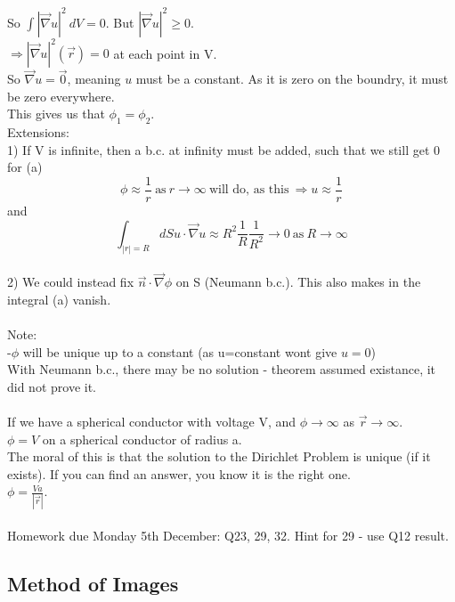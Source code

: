 \documentclass[a4paper,11pt]{article}
\newcommand{\Nab}{\vec{\nabla}}
\begin{document}
So $\int|\Nab u|^2 ~dV=0$. But $|\Nab u|^2 \geq 0$.\\
$\Rightarrow |\Nab u|^2(\vec{r})=0$ at each point in V.\\
So $\Nab u=\vec{0}$, meaning $u$ must be a constant. As it is zero on the boundry, it must be zero everywhere.\\
This gives us that $\phi_1=\phi_2$.\\
Extensions:\\
1) If V is infinite, then a b.c. at infinity must be added, such that we still get 0 for (a)
$$\phi\approx\frac{1}{r}~\text{as}~r\rightarrow\infty~ \text{will do, as this}~\Rightarrow u\approx \frac{1}{r}$$
and
$$\int_{|r|=R} dS u\cdot \Nab u\approx R^2\frac{1}{R}\frac{1}{R^2}\rightarrow 0~\text{as}~R\rightarrow \infty$$
\\
2) We could instead fix $\vec{n}\cdot \Nab \phi$ on S (Neumann b.c.). This also makes in the integral (a) vanish.\\
\\
Note:\\
-$\phi$ will be unique up to a constant (as u=constant wont give $u=0$)\\
With Neumann b.c., there may be no solution - theorem assumed existance, it did not prove it.\\
\\
If we have a spherical conductor with voltage V, and $\phi\rightarrow\infty$ as $\vec{r}\rightarrow\infty$.\\
$\phi=V$ on a spherical conductor of radius a.\\
The moral of this is that the solution to the Dirichlet Problem is unique (if it exists). If you can find an answer, you know it is the right one.\\
$\phi=\frac{Va}{|\vec{r}|}$.\\
\\
Homework due Monday 5th December: Q23, 29, 32. Hint for 29 - use Q12 result.

\subsection{Method of Images}
\end{document}

